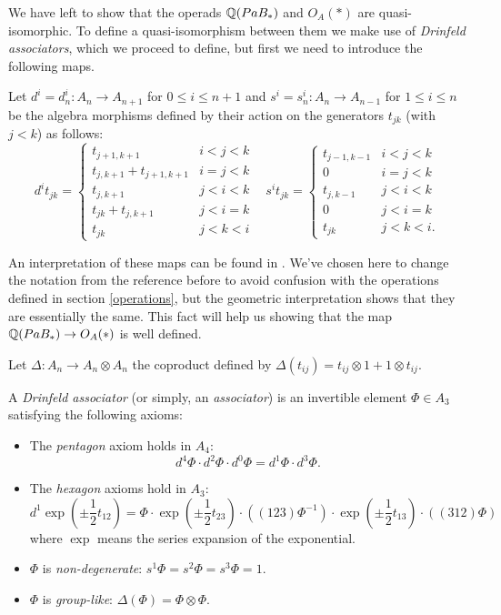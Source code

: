 \documentclass[TFM.tex]{subfiles}
\begin{document}
We have left to show that the operads $\mathbb{Q}(PaB_*)$ and $O_A(*)$ are quasi-isomorphic. To define a quasi-isomorphism between them we make use of \emph{Drinfeld associators}, which we proceed to define, but first we need to introduce the following maps.

\begin{defi}
Let $d^i = d_n^i : A_n → A_{n+1}$ for $0 ≤ i ≤ n + 1$ and $s^i = s_n^i : A_n → A_{n−1}$
for $1 ≤ i ≤ n$ be the algebra morphisms defined by their action on the generators $t_{jk}$ (with
$j < k$) as follows:
\[
d^it_{jk} =\begin{cases}
t_{j+1,k+1} & i < j < k\\
t_{j,k+1} + t_{j+1,k+1} & i = j < k\\
t_{j,k+1} & j < i < k\\
t_{jk} + t_{j,k+1} & j < i = k\\
t_{jk} & j < k < i
\end{cases}\ \ \ \
s^it_{jk} =\begin{cases}
t_{j−1,k−1} & i < j < k\\
0 & i = j < k\\
t_{j,k−1} & j < i < k\\
0 & j < i = k\\
t_{jk} & j < k < i.
\end{cases}
\]


\end{defi}
An interpretation of these maps can be found in \cite{1deTamarkin}. We've chosen here to change the notation from the reference before to avoid confusion with the operations defined in section \ref{operations}, but the geometric interpretation shows that they are essentially the same. This fact will help us showing that the map $\mathbb{Q}(PaB_*)\to O_A(*)$ is well defined.

\begin{defi}
Let $\Delta:A_n\to A_n\otimes A_n$ the coproduct defined by $\Delta(t_{ij})=t_{ij}\otimes 1+1\otimes t_{ij}$. 
\end{defi}

\begin{defi}\label{drinfeld}
	A \emph{Drinfeld associator} (or simply, an \emph{associator}) is an invertible element $\Phi\in A_3$ satisfying the following
axioms:
\begin{itemize}
\item The \emph{pentagon} axiom holds in $A_4$:
\[
d^4\Phi\cdot d^2\Phi\cdot d^0\Phi=d^1\Phi\cdot d^3\Phi.
\]
\item The \emph{hexagon} axioms hold in $A_3$:
\[
d^1\exp\left(\pm\frac{1}{2}t_{12}\right)=\Phi\cdot\exp\left(\pm\frac{1}{2}t_{23}\right)\cdot ((123)\Phi^{-1})\cdot\exp\left(\pm\frac{1}{2}t_{13}\right)\cdot((312)\Phi)
\]
where $\exp$ means the series expansion of the exponential. 
\item $\Phi$ is \emph{non-degenerate}: $s^1\Phi=s^2\Phi=s^3\Phi=1$.
\item $\Phi$ is \emph{group-like}: $\Delta(\Phi)=\Phi\otimes\Phi$. %
\end{itemize}
\end{defi}
	
\end{document}

